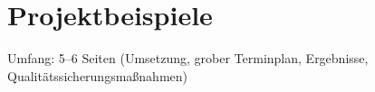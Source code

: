 \chapter{Projektbeispiele}

Umfang: 5--6 Seiten (Umsetzung, grober Terminplan, Ergebnisse, 
Qualitätssicherungsmaßnahmen)
